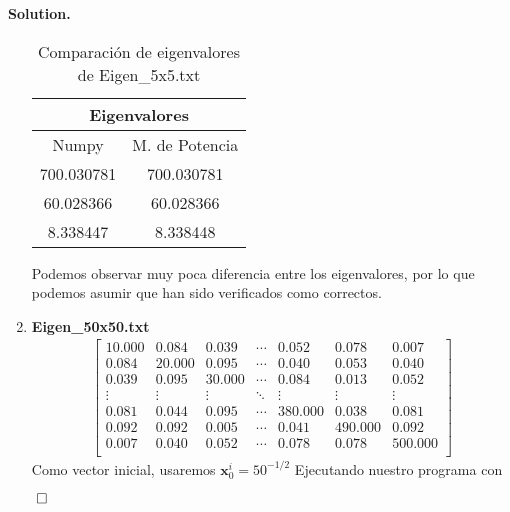 \documentclass{article}
\theoremstyle{problemstyle}
\newenvironment{solution}{%
  \begin{mdframed}[linewidth=0.8pt,linecolor=Gray,backgroundcolor=Gray!5,roundcorner=5pt]%
  \noindent\textbf{Solution.}%
}{%
\hfill $ \qed $ 
  \end{mdframed}%
}
\begin{document}
\begin{solution}
\begin{enumerate}
		      \begin{table}[H]
			      \begin{center}
				      \begin{tabular}{|c|c|}
					      \multicolumn{2}{c}{Eigenvalores} \\
					      \hline
					      Numpy      & M. de Potencia      \\
					      \hline
					      \rule{0pt}{1.5em}
					      700.030781 & 700.030781          \\
					      [0.5em]
					      \hline
					      \rule{0pt}{1.5em}
					      60.028366  & 60.028366           \\
					      [0.5em]
					      \hline
					      \rule{0pt}{1.5em}
					      8.338447   & 8.338448            \\
					      [0.5em]
					      \hline
				      \end{tabular}
			      \end{center}
			      \caption{Comparaci\'on de eigenvalores de Eigen\_5x5.txt}\label{tab:evals5x5}
		      \end{table}
		      Podemos observar muy poca diferencia entre los eigenvalores, por lo
		      que podemos asumir que han sido verificados como correctos.
		\item \textbf{Eigen\_50x50.txt}
		      \begin{align*}
			      \begin{bmatrix}
				      10.000 & 0.084  & 0.039  & \cdots & 0.052   & 0.078   & 0.007   \\
				      0.084  & 20.000 & 0.095  & \cdots & 0.040   & 0.053   & 0.040   \\
				      0.039  & 0.095  & 30.000 & \cdots & 0.084   & 0.013   & 0.052   \\
				      \vdots & \vdots & \vdots & \ddots & \vdots  & \vdots  & \vdots  \\
				      0.081  & 0.044  & 0.095  & \cdots & 380.000 & 0.038   & 0.081   \\
				      0.092  & 0.092  & 0.005  & \cdots & 0.041   & 490.000 & 0.092   \\
				      0.007  & 0.040  & 0.052  & \cdots & 0.078   & 0.078   & 500.000 \\
			      \end{bmatrix}
		      \end{align*}
		      Como vector inicial, usaremos $ \mathbf{x}^i_0 = 50^{-1/2} $
		      Ejecutando nuestro programa con
		      \begin{center}

\end{center}
\end{enumerate}
\end{solution}
\end{document}

